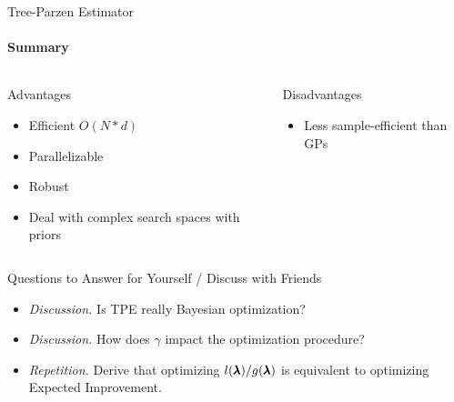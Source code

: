 \begin{frame}[c]{Tree-Parzen Estimator}
\framesubtitle{Summary}

\begin{columns}[T] %
\begin{column}{.48\textwidth}
    \begin{block}{Advantages}
    \begin{itemize}
    	\item Efficient $O(N*d)$
    	\item Parallelizable
    	\item Robust
    	\item Deal with complex search spaces with priors
    \end{itemize}
    \end{block}
\end{column}%

\hfill%

\pause

\begin{column}{.48\textwidth}
    \begin{block}{Disadvantages}
    \begin{itemize}
    	\item Less sample-efficient than GPs
    \end{itemize}
    \end{block}
\end{column}
\end{columns}   

\end{frame}
\begin{frame}[c]{Questions to Answer for Yourself / Discuss with Friends}

\begin{itemize}
    \item \emph{Discussion.} Is TPE really Bayesian optimization?
    \item \emph{Discussion.} How does $\gamma$ impact the optimization procedure?
    \item \emph{Repetition.} Derive that optimizing $l(\pmb{\lambda}) / g(\pmb{\lambda})$ is equivalent to optimizing Expected Improvement.
\end{itemize}

\end{frame}